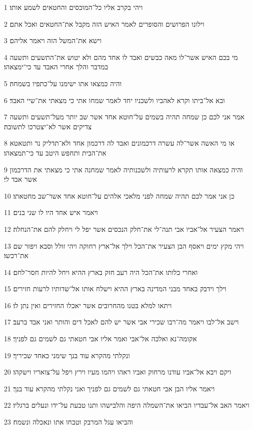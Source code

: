 \par 1 ויהי בקרב אליו כל־המוכסים והחטאים לשמע אותו׃
\par 2 וילונו הפרושים והסופרים לאמר האיש הזה מקבל את־החטאים ואכל אתם׃
\par 3 וישא את־המשל הזה ויאמר אליהם׃
\par 4 מי בכם האיש אשר־לו מאה כבשים ואבד לו אחד מהם ולא יטוש את־התשעים ותשעה במדבר והלך אחרי האבד עד כי־ימצאהו׃
\par 5 והיה כמצאו אתו ישימנו על־כתפיו בשמחה׃
\par 6 ובא אל־ביתו וקרא לאהביו ולשכניו יחד לאמר שמחו אתי כי מצאתי את־שיי האבד׃
\par 7 אמר אני לכם כן שמחה תהיה בשמים על־חוטא אחד אשר שב יותר מעל־תשעים ותשעה צדיקים אשר לא־יצטרכו לתשובה׃
\par 8 או מי האשה אשר־לה עשרה דרכמונים ואבד לה דרכמון אחד ולא־תדליק נר ותטאטא את־הבית ותחפש היטב עד כי־תמצאהו׃
\par 9 והיה כמצאה אותו תקרא לרעותיה ולשכנותיה לאמר שמחנה אתי כי מצאתי את הדרכמון אשר אבד לי׃
\par 10 כן אני אמר לכם תהיה שמחה לפני מלאכי אלהים על־חוטא אחד אשר־שב מחטאתו׃
\par 11 ויאמר איש אחד היו לו שני בנים׃
\par 12 ויאמר הצעיר אל־אביו אבי תנה־לי את־חלק הנכסים אשר יפל לי ויחלק להם את־הנחלה׃
\par 13 ויהי מקץ ימים ויאסף הבן הצעיר את־הכל וילך אל־ארץ רחוקה ויהי זולל וסבא ויפזר שם את־רכשו׃
\par 14 ואחרי כלותו את־הכל היה רעב חזק בארץ ההיא ויחל להיות חסר־לחם׃
\par 15 וילך וידבק באחד מבני המדינה בארץ ההיא וישלח אותו אל־שדותיו לרעות חזירים׃
\par 16 ויתאו למלא בטנו מהחרובים אשר יאכלו החזירים ואין נתן לו׃
\par 17 וישב אל־לבו ויאמר מה־רבו שכירי אבי אשר יש להם לאכל דים והותר ואני אבד ברעב׃
\par 18 אקומה־נא ואלכה אל־אבי ואמר אליו אבי חטאתי גם לשמים גם לפניך׃
\par 19 ונקלתי מהקרא עוד בנך שימני כאחד שכיריך׃
\par 20 ויקם ויבא אל־אביו עודנו מרחוק ואביו ראהו ויהמו מעיו וירץ ויפל על־צואריו וישקהו׃
\par 21 ויאמר אליו הבן אבי חטאתי גם לשמים גם לפניך ואני נקלתי מהקרא עוד בנך׃
\par 22 ויאמר האב אל־עבדיו הביאו את־השמלה היפה והלבישהו ותנו טבעת על־ידו ונעלים ברגליו׃
\par 23 והביאו עגל המרבק וטבחו אתו ונאכלה ונשמח׃
